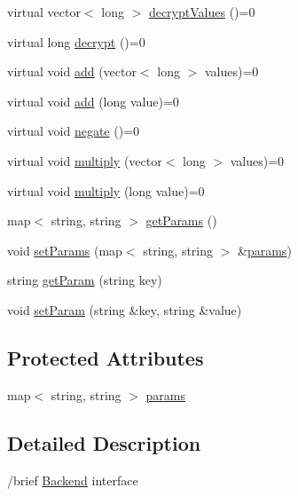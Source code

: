 \begin{DoxyCompactItemize}
\item 
virtual vector$<$ long $>$ \mbox{\hyperlink{classhomomorphine_1_1_backend_a43638a85d3e1a85957f18be262c26f58}{decrypt\+Values}} ()=0
\item 
virtual long \mbox{\hyperlink{classhomomorphine_1_1_backend_ae5c5de7bddabef1bd9a935be5bbd9646}{decrypt}} ()=0
\item 
virtual void \mbox{\hyperlink{classhomomorphine_1_1_backend_ae381fb973ade6dd6a5caf8f6785e165e}{add}} (vector$<$ long $>$ values)=0
\item 
virtual void \mbox{\hyperlink{classhomomorphine_1_1_backend_a7175812578b22d9ff19d49760cb04b26}{add}} (long value)=0
\item 
virtual void \mbox{\hyperlink{classhomomorphine_1_1_backend_ab0064461260713ce7a9f660b5f6dc5af}{negate}} ()=0
\item 
virtual void \mbox{\hyperlink{classhomomorphine_1_1_backend_a716a0d366daf9a6491ba4d33ebb57d41}{multiply}} (vector$<$ long $>$ values)=0
\item 
virtual void \mbox{\hyperlink{classhomomorphine_1_1_backend_a8b09933415165eb84234d9ccfbf2c3c4}{multiply}} (long value)=0
\item 
map$<$ string, string $>$ \mbox{\hyperlink{classhomomorphine_1_1_backend_a107e05b3bd55271356a57fbc0c1df091}{get\+Params}} ()
\item 
void \mbox{\hyperlink{classhomomorphine_1_1_backend_aed04b9aa4eb2c08801e099b16b4da4b0}{set\+Params}} (map$<$ string, string $>$ \&\mbox{\hyperlink{classhomomorphine_1_1_backend_a008e8becd641dcb9ebebd94a91e67a1b}{params}})
\item 
string \mbox{\hyperlink{classhomomorphine_1_1_backend_a34191d0dbdd9e300a88242156f90eb9b}{get\+Param}} (string key)
\item 
void \mbox{\hyperlink{classhomomorphine_1_1_backend_aacb924f4de6d50347d550da85aec15a2}{set\+Param}} (string \&key, string \&value)
\end{DoxyCompactItemize}
\subsection*{Protected Attributes}
\begin{DoxyCompactItemize}
\item 
map$<$ string, string $>$ \mbox{\hyperlink{classhomomorphine_1_1_backend_a008e8becd641dcb9ebebd94a91e67a1b}{params}}
\end{DoxyCompactItemize}


\subsection{Detailed Description}
/brief \mbox{\hyperlink{classhomomorphine_1_1_backend}{Backend}} interface

